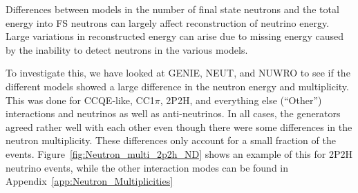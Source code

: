 \documentclass[12pt]{article}
\begin{document}
Differences between models in the number of final state neutrons and the total energy into FS neutrons can largely affect reconstruction of neutrino energy. Large variations in reconstructed energy can arise due to missing energy caused by the inability to detect neutrons in the various models.  

To investigate this, we have looked at GENIE, NEUT, and NUWRO to see if the different models showed a large difference in the neutron energy and multiplicity.  
This was done for CCQE-like, CC1$\pi$, 2P2H, and everything else (``Other'') interactions and neutrinos as well as anti-neutrinos.  
In all cases, the generators agreed rather well with each other even though there were some differences in the neutron multiplicity. 
These differences only account for a small fraction of the events.
Figure~\ref{fig:Neutron_multi_2p2h_ND} shows an example of this for 2P2H neutrino events, while the other interaction modes can be found in Appendix~\ref{app:Neutron_Multiplicities}
  
\end{document}
